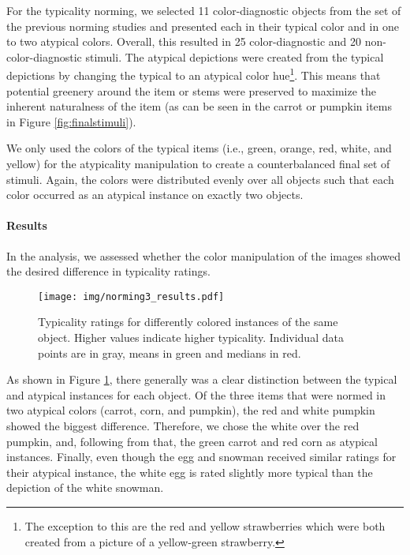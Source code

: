 \documentclass[a4paper,man,floatsintext,natbib,donotrepeattitle]{apa6}
\begin{document}
For the typicality norming, we selected 11 color-diagnostic objects from the set of the previous norming studies and presented each in their typical color and in one to two atypical colors. Overall, this resulted in 25 color-diagnostic and 20 non-color-diagnostic stimuli. The atypical depictions were created from the typical depictions by changing the typical to an atypical color hue\footnote{The exception to this are the red and yellow strawberries which were both created from a picture of a yellow-green strawberry.}. This means that potential greenery around the item or stems were preserved to maximize the inherent naturalness of the item (as can be seen in the carrot or pumpkin items in Figure \ref{fig:finalstimuli}). 

We only used the colors of the typical items (i.e., green, orange, red, white, and yellow) for the atypicality manipulation to create a counterbalanced final set of stimuli. Again, the colors were distributed evenly over all objects such that each color occurred as an atypical instance on exactly two objects. 


\paragraph{Results}
In the analysis, we assessed whether the color manipulation of the images showed the desired difference in typicality ratings.

\begin{figure}
	\texttt{[image: img/norming3\_results.pdf]}
	\caption{Typicality ratings for differently colored instances of the same object. Higher values indicate higher typicality. Individual data points are in gray, means in green and medians in red.}
	\label{fig:norming3results}
\end{figure}

As shown in Figure \ref{fig:norming3results}, there generally was a clear distinction between the typical and atypical instances for each object. 
Of the three items that were normed in two atypical colors (carrot, corn, and pumpkin), the red and white pumpkin showed the biggest difference. Therefore, we chose the white over the red pumpkin, and, following from that, the green carrot and red corn as atypical instances. 
Finally, even though the egg and snowman received similar ratings for their atypical instance, the white egg is rated slightly more typical than the depiction of the white snowman.
\end{document}
